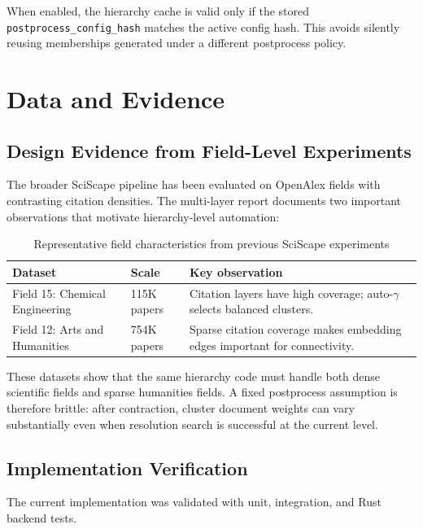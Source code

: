 \documentclass[11pt,a4paper]{article}
\begin{document}
When enabled, the hierarchy cache is valid only if the stored
\texttt{postprocess\_config\_hash} matches the active config hash. This avoids
silently reusing memberships generated under a different postprocess policy.

\section{Data and Evidence}

\subsection{Design Evidence from Field-Level Experiments}

The broader SciScape pipeline has been evaluated on OpenAlex fields with
contrasting citation densities. The multi-layer report documents two important
observations that motivate hierarchy-level automation:

\begin{table}[h]
\centering
\caption{Representative field characteristics from previous SciScape experiments}
\begin{tabularx}{\textwidth}{p{}p{}X}
\toprule
Dataset & Scale & Key observation \\
\midrule
Field 15: Chemical Engineering
    & 115K papers
    & Citation layers have high coverage; auto-$\gamma$ selects balanced clusters. \\
Field 12: Arts and Humanities
    & 754K papers
    & Sparse citation coverage makes embedding edges important for connectivity. \\
\bottomrule
\end{tabularx}
\end{table}

These datasets show that the same hierarchy code must handle both dense
scientific fields and sparse humanities fields. A fixed postprocess assumption
is therefore brittle: after contraction, cluster document weights can vary
substantially even when resolution search is successful at the current level.

\subsection{Implementation Verification}

The current implementation was validated with unit, integration, and Rust
backend tests.
\end{document}
